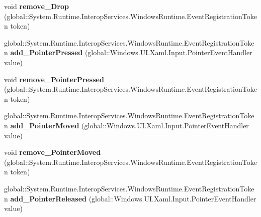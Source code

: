 \begin{DoxyCompactItemize}
\item 
\mbox{\label{interface_windows_1_1_u_i_1_1_xaml_1_1_i_u_i_element_a8138853a5ec389ca042bd806a4488df2}} 
void {\bfseries remove\+\_\+\+Drop} (global\+::\+System.\+Runtime.\+Interop\+Services.\+Windows\+Runtime.\+Event\+Registration\+Token token)
\item 
\mbox{\label{interface_windows_1_1_u_i_1_1_xaml_1_1_i_u_i_element_ac6c56c4e4d441548d94d567610440f7a}} 
global\+::\+System.\+Runtime.\+Interop\+Services.\+Windows\+Runtime.\+Event\+Registration\+Token {\bfseries add\+\_\+\+Pointer\+Pressed} (global\+::\+Windows.\+U\+I.\+Xaml.\+Input.\+Pointer\+Event\+Handler value)
\item 
\mbox{\label{interface_windows_1_1_u_i_1_1_xaml_1_1_i_u_i_element_a11ea5ff510170be96baba63e50ef0d68}} 
void {\bfseries remove\+\_\+\+Pointer\+Pressed} (global\+::\+System.\+Runtime.\+Interop\+Services.\+Windows\+Runtime.\+Event\+Registration\+Token token)
\item 
\mbox{\label{interface_windows_1_1_u_i_1_1_xaml_1_1_i_u_i_element_a186c081f1e37b9989fc4ddd5820d840c}} 
global\+::\+System.\+Runtime.\+Interop\+Services.\+Windows\+Runtime.\+Event\+Registration\+Token {\bfseries add\+\_\+\+Pointer\+Moved} (global\+::\+Windows.\+U\+I.\+Xaml.\+Input.\+Pointer\+Event\+Handler value)
\item 
\mbox{\label{interface_windows_1_1_u_i_1_1_xaml_1_1_i_u_i_element_ad8d5295f79014845522686f6bf012501}} 
void {\bfseries remove\+\_\+\+Pointer\+Moved} (global\+::\+System.\+Runtime.\+Interop\+Services.\+Windows\+Runtime.\+Event\+Registration\+Token token)
\item 
\mbox{\label{interface_windows_1_1_u_i_1_1_xaml_1_1_i_u_i_element_ab3b709a6be4af0f8547f52d2157bd763}} 
global\+::\+System.\+Runtime.\+Interop\+Services.\+Windows\+Runtime.\+Event\+Registration\+Token {\bfseries add\+\_\+\+Pointer\+Released} (global\+::\+Windows.\+U\+I.\+Xaml.\+Input.\+Pointer\+Event\+Handler value)
\item 

\end{DoxyCompactItemize}

